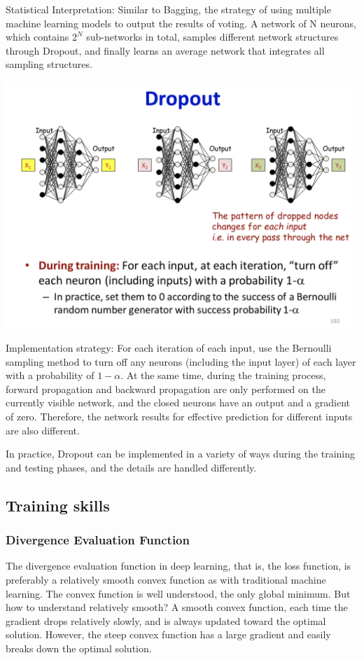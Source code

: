 \documentclass{article}
\begin{document}
	Statistical Interpretation: Similar to Bagging, the strategy of using multiple machine learning models to output the results of voting. A network of N neurons, which contains $2^N$ sub-networks in total, samples different network structures through Dropout, and finally learns an average network that integrates all sampling structures.
	
	\includegraphics[scale=0.2]{101.png}
	
	Implementation strategy: For each iteration of each input, use the Bernoulli sampling method to turn off any neurons (including the input layer) of each layer with a probability of $1-\alpha$. At the same time, during the training process, forward propagation and backward propagation are only performed on the currently visible network, and the closed neurons have an output and a gradient of zero. Therefore, the network results for effective prediction for different inputs are also different.
	
	In practice, Dropout can be implemented in a variety of ways during the training and testing phases, and the details are handled differently.
	
	\subsection{Training skills}
	
	\subsubsection{Divergence Evaluation Function}
	
	The divergence evaluation function in deep learning, that is, the loss function, is preferably a relatively smooth convex function as with traditional machine learning. The convex function is well understood, the only global minimum. But how to understand relatively smooth? A smooth convex function, each time the gradient drops relatively slowly, and is always updated toward the optimal solution. However, the steep convex function has a large gradient and easily breaks down the optimal solution.
	
\end{document}
